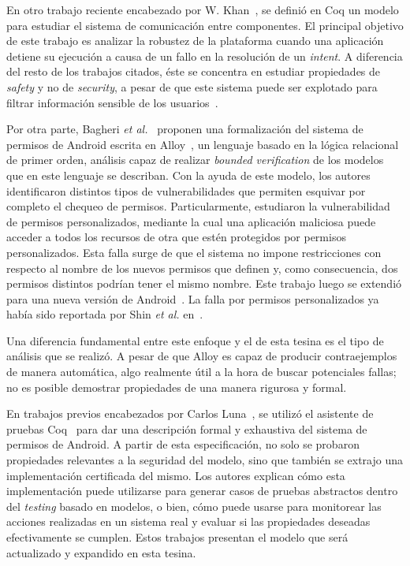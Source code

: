 En otro trabajo reciente encabezado por W. Khan~\cite{crashsafe}, se definió en
Coq un modelo para estudiar el sistema de comunicación entre componentes. El
principal objetivo de este trabajo es analizar la robustez de la plataforma
cuando una aplicación detiene su ejecución a causa de un fallo en la resolución
de un \textit{intent}. A diferencia del resto de los trabajos citados, éste se
concentra en estudiar propiedades de \textit{safety} y no de \textit{security}, a
pesar de que este sistema puede ser explotado para filtrar información sensible de
los usuarios~\cite{iccta}.

Por otra parte, Bagheri \textit{et al.}~\cite{bagheri15} proponen una
formalización del sistema de permisos de Android escrita en Alloy~\cite{alloy},
un lenguaje basado en la lógica relacional de primer orden,
%
%
análisis capaz de realizar \textit{bounded verification} de los modelos que en
este lenguaje se describan. Con la ayuda de este modelo, los autores
identificaron distintos tipos de vulnerabilidades que permiten esquivar por
completo el chequeo de permisos. Particularmente, estudiaron la vulnerabilidad
de permisos personalizados, mediante la cual una aplicación maliciosa puede
acceder a todos los recursos de otra que estén protegidos por permisos
personalizados. Esta falla surge de que el sistema no impone restricciones con
respecto al nombre de los nuevos permisos que definen y, como consecuencia, dos
permisos distintos podrían tener el mismo nombre. Este trabajo luego se extendió
para una nueva versión de Android~\cite{bagheri}. La falla por permisos
personalizados ya había sido reportada por Shin \textit{et al.}
en~\cite{shin-custom}.

Una diferencia fundamental entre este enfoque y el de esta tesina es el tipo de
análisis que se realizó. A pesar de que Alloy es capaz de producir
contraejemplos de manera automática, algo realmente útil a la hora de buscar
potenciales fallas; no es posible demostrar propiedades de una manera rigurosa y
formal.

En trabajos previos encabezados por Carlos Luna~\cite{betarte, luna-cleiej}, se
utilizó el asistente de pruebas Coq~\cite{coq} para dar una descripción formal y
exhaustiva del sistema de permisos de Android. A partir de esta especificación,
no solo se probaron propiedades relevantes a la seguridad del modelo, sino que
también se extrajo una implementación certificada del mismo. Los autores explican
cómo esta implementación puede utilizarse para generar casos de pruebas abstractos
dentro del \textit{testing} basado en modelos, o bien, cómo puede usarse para
monitorear las acciones realizadas en un sistema real y evaluar si las propiedades
deseadas efectivamente se cumplen. Estos trabajos presentan el modelo que será
actualizado y expandido en esta tesina.